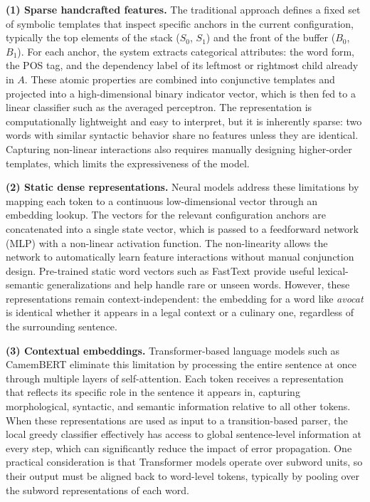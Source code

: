\documentclass[12pt,letterpaper]{article}
\begin{document}
\textbf{(1) Sparse handcrafted features.} The traditional approach defines a fixed set of symbolic templates that inspect specific anchors in the current configuration, typically the top elements of the stack ($S_0$, $S_1$) and the front of the buffer ($B_0$, $B_1$). For each anchor, the system extracts categorical attributes: the word form, the POS tag, and the dependency label of its leftmost or rightmost child already in $A$. These atomic properties are combined into conjunctive templates and projected into a high-dimensional binary indicator vector, which is then fed to a linear classifier such as the averaged perceptron. The representation is computationally lightweight and easy to interpret, but it is inherently sparse: two words with similar syntactic behavior share no features unless they are identical. Capturing non-linear interactions also requires manually designing higher-order templates, which limits the expressiveness of the model.

\textbf{(2) Static dense representations.} Neural models address these limitations by mapping each token to a continuous low-dimensional vector through an embedding lookup. The vectors for the relevant configuration anchors are concatenated into a single state vector, which is passed to a feedforward network (MLP) with a non-linear activation function. The non-linearity allows the network to automatically learn feature interactions without manual conjunction design. Pre-trained static word vectors such as FastText provide useful lexical-semantic generalizations and help handle rare or unseen words. However, these representations remain context-independent: the embedding for a word like \textit{avocat} is identical whether it appears in a legal context or a culinary one, regardless of the surrounding sentence.

\textbf{(3) Contextual embeddings.} Transformer-based language models such as CamemBERT \cite{martin2020camembert} eliminate this limitation by processing the entire sentence at once through multiple layers of self-attention. Each token receives a representation that reflects its specific role in the sentence it appears in, capturing morphological, syntactic, and semantic information relative to all other tokens. When these representations are used as input to a transition-based parser, the local greedy classifier effectively has access to global sentence-level information at every step, which can significantly reduce the impact of error propagation. One practical consideration is that Transformer models operate over subword units, so their output must be aligned back to word-level tokens, typically by pooling over the subword representations of each word.
\end{document}
